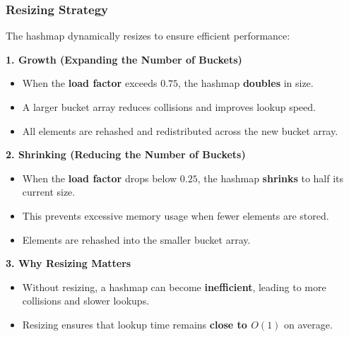 \documentclass[titlepage]{article}
\begin{document}
\subsubsection{Resizing Strategy}

The hashmap dynamically resizes to ensure efficient performance:

\textbf{1. Growth (Expanding the Number of Buckets)}
\begin{itemize}
    \item When the \textbf{load factor} exceeds $0.75$, the hashmap \textbf{doubles} in size.
    \item A larger bucket array reduces collisions and improves lookup speed.
    \item All elements are rehashed and redistributed across the new bucket array.
\end{itemize}

\textbf{2. Shrinking (Reducing the Number of Buckets)}
\begin{itemize}
    \item When the \textbf{load factor} drops below $0.25$, the hashmap \textbf{shrinks} to half its current size.
    \item This prevents excessive memory usage when fewer elements are stored.
    \item Elements are rehashed into the smaller bucket array.
\end{itemize}

\textbf{3. Why Resizing Matters}
\begin{itemize}
    \item Without resizing, a hashmap can become \textbf{inefficient}, leading to more collisions and slower lookups.
    \item Resizing ensures that lookup time remains \textbf{close to $O(1)$} on average.
\end{itemize}
\end{document}
